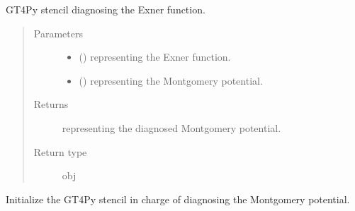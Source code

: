 \documentclass[letterpaper,10pt,english]{sphinxmanual}
\begin{document}
\begin{fulllineitems}
\begin{fulllineitems}
\label{\detokenize{api:tasmania.dycore.diagnostic_isentropic.DiagnosticIsentropic._stencil_diagnosing_montgomery_defs}}
GT4Py stencil diagnosing the Exner function.
\begin{quote}\begin{description}
\item[{Parameters}] \leavevmode\begin{itemize}
\item {} 
 () \textendash{}  representing the Exner function.

\item {} 
 () \textendash{}  representing the Montgomery potential.

\end{itemize}

\item[{Returns}] \leavevmode
{} representing the diagnosed Montgomery potential.

\item[{Return type}] \leavevmode
obj

\end{description}\end{quote}

\end{fulllineitems}


\begin{fulllineitems}
\label{\detokenize{api:tasmania.dycore.diagnostic_isentropic.DiagnosticIsentropic._stencil_diagnosing_montgomery_initialize}}
Initialize the GT4Py stencil in charge of diagnosing the Montgomery potential.

\end{fulllineitems}



\end{fulllineitems}
\end{document}

